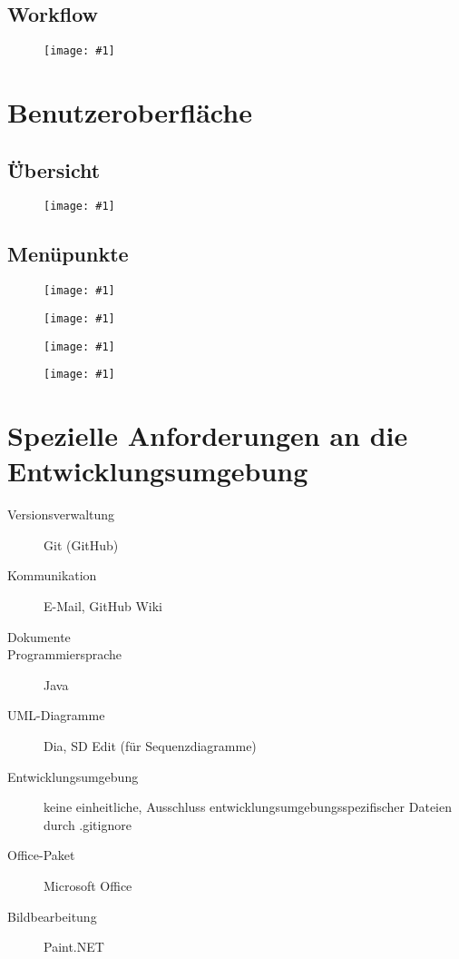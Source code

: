 \documentclass[a4paper,10pt]{article}
\newlength{\imgwidth}
\newcommand\scalegraphics[1]{
  \settowidth{\imgwidth}{\texttt{[image: \#1]}}
  \setlength{\imgwidth}{\minof{\imgwidth}{\textwidth}}
  \texttt{[image: \#1]}
}
\begin{document}
\newpage
\subsection{Workflow}
\begin{figure}[h!]
\scalegraphics{images/process.png}
\end{figure}


\section{Benutzeroberfl\"{a}che}
\subsection{\"{Ü}bersicht}
\begin{figure}[h!]
\scalegraphics{images/mockupf.png}
\end{figure}

\newpage
\subsection{Men\"{u}punkte}
\begin{figure}[h!]
\scalegraphics{images/menu1.png}
\end{figure}
\begin{figure}[h!]
\scalegraphics{images/menu2.png}
\end{figure}
\begin{figure}[h!]
\scalegraphics{images/menu3.png}
\end{figure}
\begin{figure}[h!]
\scalegraphics{images/menu4.png}
\end{figure}

\section{Spezielle Anforderungen an die Entwicklungsumgebung}
\begin{description}
  \item[Versionsverwaltung] Git (GitHub)
  \item[Kommunikation] E-Mail, GitHub Wiki
  \item[Dokumente] \LaTeXe
  \item[Programmiersprache] Java
  \item[UML-Diagramme] Dia, SD Edit (f\"{u}r Sequenzdiagramme)
  \item[Entwicklungsumgebung] keine einheitliche, Ausschluss entwicklungsumgebungsspezifischer Dateien durch .gitignore
  \item[Office-Paket] Microsoft Office
  \item[Bildbearbeitung] Paint.NET
\end{description}
\end{document}
